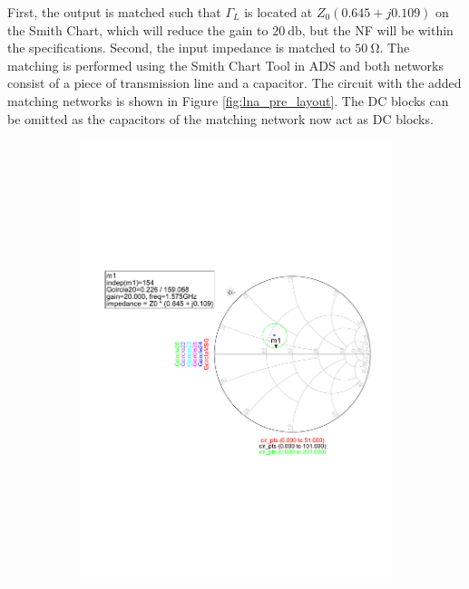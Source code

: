 \documentclass[a4paper]{article}        %
\begin{document}
			First, the output is matched such that $\Gamma_L$ is located at $Z_0 (0.645 + j 0.109)$ on the Smith Chart, which will reduce the gain to $\SI{20}{\decibel}$, but the NF will be within the specifications. Second, the input impedance is matched to $\SI{50}{\ohm}$. The matching is performed using the Smith Chart Tool in ADS and both networks consist of a piece of transmission line and a capacitor. The circuit with the added matching networks is shown in Figure \ref{fig:lna_pre_layout}. The DC blocks can be omitted as the capacitors of the matching network now act as DC blocks. 

			\begin{figure}[H]
			\begin{subfigure}{0.5\textwidth}
				\centering
				\includegraphics[width=\textwidth]{fig/LNA/LNA_gain_circle.pdf}
			\end{subfigure}
			\begin{subfigure}{0.5\textwidth}

\end{subfigure}
\end{figure}
\end{document}
